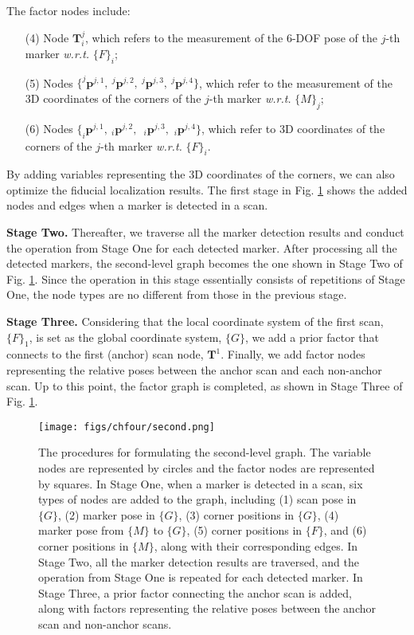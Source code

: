 \noindent The factor nodes include: 
\begin{itemize}
    \item [(4)] Node $\mathbf{T}^{j}_{i}$, which refers to the measurement of the 6-DOF pose of the $j$-th marker \textit{w.r.t.} $\{F\}_{i}$;
    \item [(5)] Nodes $\{ ^{j}\mathbf{p}^{j,1}, \ ^{j}\mathbf{p}^{j,2}, \ ^{j}\mathbf{p}^{j,3}, \ ^{j}\mathbf{p}^{j,4} \}$, which refer to the measurement of the 3D coordinates of the corners of the $j$-th marker \textit{w.r.t.} $\{M\}_{j}$;

    \item [(6)] Nodes $\{ _{i}\mathbf{p}^{j,1}, \ _{i}\mathbf{p}^{j,2},$\ $ _{i}\mathbf{p}^{j,3},$ $_{i}\mathbf{p}^{j,4} \}$, which refer to 3D coordinates of the corners of the $j$-th marker \textit{w.r.t.} $\{F\}_{i}$.
\end{itemize}
By adding variables representing the 3D coordinates of the corners, we can also optimize the fiducial localization results. The first stage in Fig. \ref{secondgraph} shows the added nodes and edges when a marker is detected in a scan. \par
\noindent\textbf{Stage Two.} Thereafter, we traverse all the marker detection results and conduct the operation from Stage One for each detected marker. 
After processing all the detected markers, the second-level graph becomes the one shown in Stage Two of Fig. \ref{secondgraph}. Since the operation in this stage essentially consists of repetitions of Stage One, the node types are no different from those in the previous stage. \par
\noindent\textbf{Stage Three.} Considering that the local coordinate system of the first scan, $\{F\}_{1}$, is set as the global coordinate system, $\{G\}$, we add a prior factor that connects to the first (anchor) scan node,  $\mathbf{T}^{1}$. Finally, we add factor nodes representing the relative poses between the anchor scan and each non-anchor scan. Up to this point, the factor graph is completed, as shown in Stage Three of Fig. \ref{secondgraph}. \par
\begin{figure}[H]
	\centering
	\texttt{[image: figs/chfour/second.png]}

	\caption{The procedures for formulating the second-level graph. The variable nodes are represented by circles and the factor nodes are represented by squares. In Stage One, when a marker is detected in a scan, six types of nodes are added to the graph, including (1) scan pose in $\{G\}$, (2) marker pose in   $\{G\}$, (3) corner positions in $\{G\}$, (4) marker pose from $\{M\}$ to $\{G\}$, (5) corner positions in $\{F\}$, and (6) corner positions in $\{M\}$, along with their corresponding edges. In Stage Two, all the marker detection results are traversed, and the operation from Stage One is repeated for each detected marker.  In Stage Three, a prior factor connecting the anchor scan is added, along with factors representing the relative poses between the anchor scan and non-anchor scans.} \label{secondgraph}

\end{figure} 
